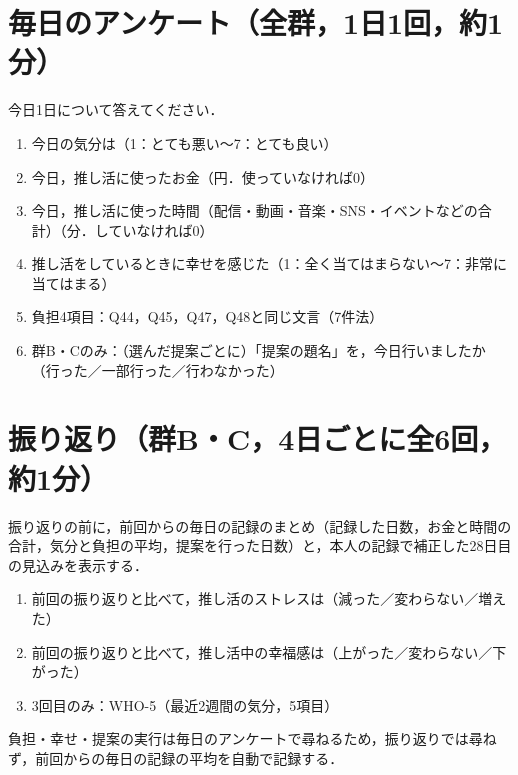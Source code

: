 \section*{毎日のアンケート（全群，1日1回，約1分）}
\noindent 今日1日について答えてください．
\begin{enumerate}
\item 今日の気分は（1：とても悪い〜7：とても良い）
\item 今日，推し活に使ったお金（円．使っていなければ0）
\item 今日，推し活に使った時間（配信・動画・音楽・SNS・イベントなどの合計）（分．していなければ0）
\item 推し活をしているときに幸せを感じた（1：全く当てはまらない〜7：非常に当てはまる）
\item 負担4項目：Q44，Q45，Q47，Q48と同じ文言（7件法）
\item 群B・Cのみ：（選んだ提案ごとに）「提案の題名」を，今日行いましたか（行った／一部行った／行わなかった）
\end{enumerate}
\section*{振り返り（群B・C，4日ごとに全6回，約1分）}
\noindent 振り返りの前に，前回からの毎日の記録のまとめ（記録した日数，お金と時間の合計，気分と負担の平均，提案を行った日数）と，本人の記録で補正した28日目の見込みを表示する．
\begin{enumerate}
\item 前回の振り返りと比べて，推し活のストレスは（減った／変わらない／増えた）
\item 前回の振り返りと比べて，推し活中の幸福感は（上がった／変わらない／下がった）
\item 3回目のみ：WHO-5（最近2週間の気分，5項目）
\end{enumerate}
\noindent 負担・幸せ・提案の実行は毎日のアンケートで尋ねるため，振り返りでは尋ねず，前回からの毎日の記録の平均を自動で記録する．

